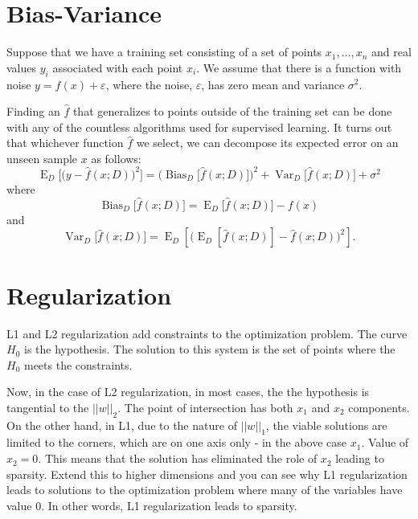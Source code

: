 \documentclass{article}
\begin{document}
\section{Bias-Variance}
Suppose that we have a training set consisting of a set of points $x_{1},\dots ,x_{n}$ and real values $y_{i}$ associated with each point $x_{i}$. We assume that there is a function with noise $y=f(x)+\varepsilon$, where the noise, $\varepsilon$, has zero mean and variance $\sigma^{2}$.

Finding an $\hat{f}$ that generalizes to points outside of the training set can be done with any of the countless algorithms used for supervised learning. It turns out that whichever function $\hat{f}$ we select, we can decompose its expected error on an unseen sample $x$ as follows:
\[ \operatorname {E} _{D}{\Big [}{\big (}y-{\hat {f}}(x;D){\big )}^{2}{\Big ]}={\Big (}\operatorname {Bias} _{D}{\big [}{\hat {f}}(x;D){\big ]}{\Big )}^{2}+\operatorname {Var} _{D}{\big [}{\hat {f}}(x;D){\big ]}+\sigma ^{2} \]
where
\[ \operatorname {Bias} _{D}{\big [}{\hat {f}}(x;D){\big ]}=\operatorname {E} _{D}{\big [}{\hat {f}}(x;D){\big ]}-f(x) \]
and
\[ \operatorname {Var} _{D}{\big [}{\hat {f}}(x;D){\big ]}=\operatorname {E} _{D}[{\big (}\operatorname {E} _{D}[{\hat {f}}(x;D)]-{\hat {f}}(x;D){\big )}^{2}]. \]


\section{Regularization}
L1 and L2 regularization add constraints to the optimization problem. The curve $H_0$ is the hypothesis. The solution to this system is the set of points where the $H_0$ meets the constraints.

Now, in the case of L2 regularization, in most cases, the the hypothesis is tangential to the $||w||_2$. The point of intersection has both $x_1$ and $x_2$ components. On the other hand, in L1, due to the nature of $||w||_1$, the viable solutions are limited to the corners, which are on one axis only - in the above case $x_1$. Value of $x_2 = 0$. This means that the solution has eliminated the role of $x_2$ leading to sparsity. Extend this to higher dimensions and you can see why L1 regularization leads to solutions to the optimization problem where many of the variables have value $0$.
In other words, L1 regularization leads to sparsity.
\end{document}
